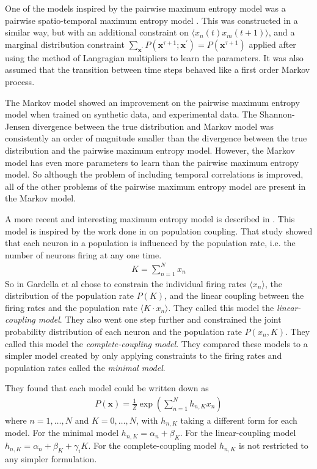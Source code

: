 \documentclass[a4paper,12pt]{article}
\theoremstyle{definition}
\begin{document}
	One of the models inspired by the pairwise maximum entropy model was a pairwise spatio-temporal maximum entropy model \cite{marre}. This was constructed in a similar way, but with an additional constraint on $\langle x_n(t) x_m(t+1) \rangle$, and a marginal distribution constraint $\sum_{\mathbf{x}^\prime} P(\mathbf{x}^{\tau + 1}; \mathbf{x}^\prime) = P(\mathbf{x}^{\tau + 1})$ applied after using the method of Langragian multipliers to learn the parameters. It was also assumed that the transition between time steps behaved like a first order Markov process.
	
	The Markov model showed an improvement on the pairwise maximum entropy model when trained on synthetic data, and experimental data. The Shannon-Jensen divergence between the true distribution and Markov model was consistently an order of magnitude smaller than the divergence between the true distribution and the pairwise maximum entropy model. However, the Markov model has even more parameters to learn than the pairwise maximum entropy model. So although the problem of including temporal correlations is improved, all of the other problems of the pairwise maximum entropy model are present in the Markov model.
	
	A more recent and interesting maximum entropy model is described in \cite{gardella}. This model is inspired by the work done in \cite{okun} on population coupling. That study showed that each neuron in a population is influenced by the population rate, i.e. the number of neurons firing at any one time.
	\begin{align*}
	K = \sum_{n=1}^N x_n
	\end{align*}		
	So in \cite{gardella} Gardella et al chose to constrain the individual firing rates $\langle x_n \rangle$, the distribution of the population rate $P(K)$, and the linear coupling between the firing rates and the population rate $\langle K\cdot x_n \rangle$. They called this model the \textit{linear-coupling model}. They also went one step further and constrained the joint probability distribution of each neuron and the population rate $P(x_n, K)$. They called this model the \textit{complete-coupling model}. They compared these models to a simpler model created by only applying constraints to the firing rates and population rates called the \textit{minimal model}. 
	
	They found that each model could be written down as 
	\begin{align}
	P(\mathbf{x}) = \frac{1}{Z} \exp \left( \sum_{n=1}^N h_{n,K} x_n \right)
	\end{align}		
	where $n = 1, \dots, N$ and $K = 0, \dots, N$, with $h_{n,K}$ taking a different form for each model. For the minimal model $h_{n,K} = \alpha_n + \beta_K$. For the linear-coupling model $h_{n,K} = \alpha_n + \beta_K + \gamma_i K$. For the complete-coupling model $h_{n,K}$ is not restricted to any simpler formulation.
	
\end{document}
